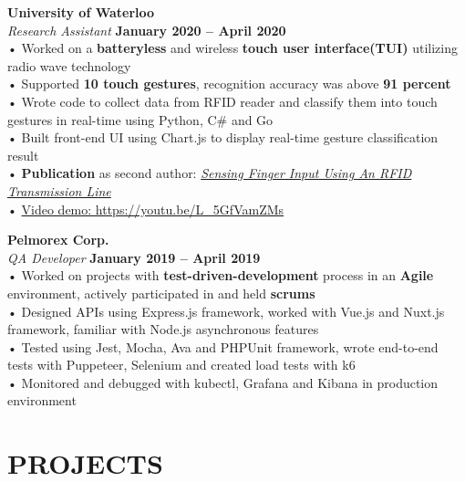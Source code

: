 \documentclass[margin,line]{resume}
\begin{document}
\begin{resume}
    \textbf{\listing University of Waterloo} \vspace{2mm}\\\vspace{1mm}%
    \textsl{Research Assistant} \hfill \textbf{January 2020 -- April 2020}\\
    • Worked on a \textbf{batteryless} and wireless \textbf{touch user interface(TUI)} utilizing radio wave technology \\
    • Supported \textbf{10 touch gestures}, recognition accuracy was above \textbf{91 percent}\\
    • Wrote code to collect data from RFID reader and classify them into touch gestures in real-time using Python, C\# and Go\\
    • Built front-end UI using Chart.js to display real-time gesture classification result\\
    • \textbf{Publication} as second author: \href{https://dl.acm.org/doi/10.1145/3384419.3430712}{\emph{Sensing Finger Input Using An RFID Transmission Line}}\\
    • \href{https://youtu.be/L_5GfVamZMs}{Video demo: https://youtu.be/L\_5GfVamZMs}
    \vspace{-1mm}

    \textbf{\listing Pelmorex Corp.} \vspace{2mm}\\\vspace{1mm}%
    \textsl{QA Developer} \hfill \textbf{January 2019 -- April 2019}\\
    • Worked on projects with \textbf{test-driven-development} process in an \textbf{Agile} environment, actively parti\-cipated in and held \textbf{scrums}\\
    • Designed APIs using Express.js framework, worked with Vue.js and Nuxt.js framework, familiar with Node.js asynchronous features\\
    • Tested using Jest, Mocha, Ava and PHPUnit framework, wrote end-to-end tests with Puppeteer, Selenium and created load tests with k6\\
    • Monitored and debugged with kubectl, Grafana and Kibana in production environment
    
    \vspace{-1mm}
\sectionline
    \section{\mysidestyle \textbf{\large{P}\small{ROJECTS}}}


\end{resume}
\end{document}

